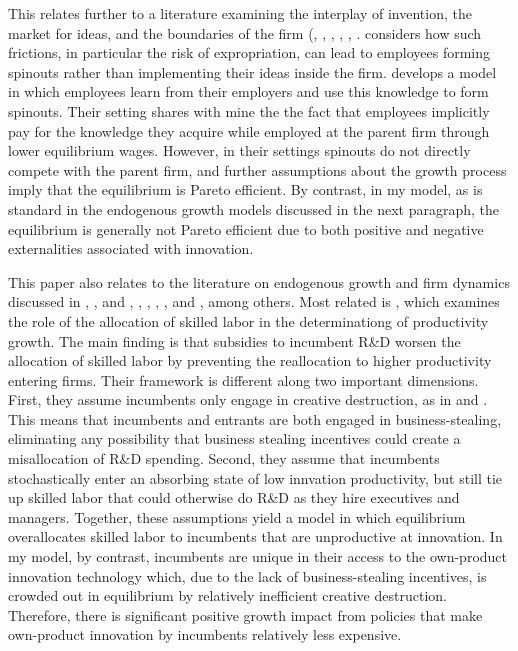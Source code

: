 \documentclass[11pt,english]{article}
\theoremstyle{definition}
\begin{document}
This relates further to a literature examining the interplay of invention, the market for ideas, and the boundaries of the firm (\cite{arrow_economic_1962}, \cite{anton_expropriation_1994}, \cite{anton_sale_2002}, \cite{anton_start-ups_1995}, \cite{franco_spin-outs_2006}, \cite{chatterjee_spinoffs_2012}. \cite{anton_start-ups_1995} considers how such frictions, in particular the risk of expropriation, can lead to employees forming spinouts rather than implementing their ideas inside the firm. \cite{franco_spin-outs_2006} develops a model in which employees learn from their employers and use this knowledge to form spinouts. Their setting shares with mine the the fact that employees implicitly pay for the knowledge they acquire while employed at the parent firm through lower equilibrium wages. However, in their settings spinouts do not directly compete with the parent firm, and further assumptions about the growth process imply that the equilibrium is Pareto efficient. By contrast, in my model, as is standard in the endogenous growth models discussed in the next paragraph, the equilibrium is generally not Pareto efficient due to both positive and negative externalities associated with innovation.

This paper also relates to the literature on endogenous growth and firm dynamics discussed in \cite{romer_increasing_1986}, \cite{grossman_quality_1991}, and \cite{aghion_model_1992}, \cite{klette_innovating_2004}, \cite{lentz_empirical_2008}, \cite{acemoglu_innovation_2015}, \cite{acemoglu_innovation_2018}, and \cite{akcigit_growth_2018}, among others. Most related is \cite{acemoglu_innovation_2018}, which examines the role of the allocation of skilled labor in the determinationg of productivity growth. The main finding is that subsidies to incumbent R\&D worsen the allocation of skilled labor by preventing the reallocation to higher productivity entering firms. Their framework is different along two important dimensions. First, they assume incumbents only engage in creative destruction, as in \cite{klette_innovating_2004} and \cite{lentz_empirical_2008}. This means that incumbents and entrants are both engaged in business-stealing, eliminating any possibility that business stealing incentives could create a misallocation of R\&D spending. Second, they assume that incumbents stochastically enter an absorbing state of low innvation productivity, but still tie up skilled labor that could otherwise do R\&D as they hire executives and managers. Together, these assumptions yield a model in which equilibrium overallocates skilled labor to incumbents that are unproductive at innovation. In my model, by contrast, incumbents are unique in their access to the own-product innovation technology which, due to the lack of business-stealing incentives, is crowded out in equilibrium by relatively inefficient creative destruction. Therefore, there is significant positive growth impact from policies that make own-product innovation by incumbents relatively less expensive.
\end{document}
